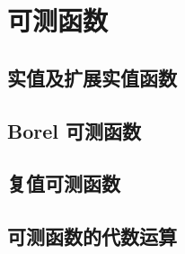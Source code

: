 \section{可测函数}
\label{b1:sec:0401}


\subsection{实值及扩展实值函数}
\label{b1:subsec:040101}

\subsection{Borel 可测函数}
\label{b1:subsec:040102}

\subsection{复值可测函数}
\label{b1:subsec:040103}

\subsection{可测函数的代数运算}
\label{b1:subsec:040104}


